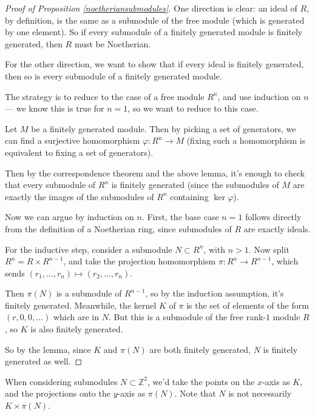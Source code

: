 \begin{proof}[Proof of Proposition \ref{noetheriansubmodules}]
    One direction is clear: an ideal of $R$, by definition, is the same as a submodule of the free module (which is generated by one element). So if every submodule of a finitely generated module is finitely generated, then $R$ must be Noetherian. 

    For the other direction, we want to show that if every ideal is finitely generated, then so is every submodule of a finitely generated module. 

    The strategy is to reduce to the case of a free module $R^n$, and use induction on $n$ --- we know this is true for $n = 1$, so we want to reduce to this case. 

    Let $M$ be a finitely generated module. Then by picking a set of generators, we can find a surjective homomorphism $\varphi : R^n \to M$ (fixing such a homomorphism is equivalent to fixing a set of generators). 

    Then by the correspondence theorem and the above lemma, it's enough to check that every submodule of $R^n$ is finitely generated (since the submodules of $M$ are exactly the images of the submodules of $R^n$ containing $\ker \varphi$). 

    Now we can argue by induction on $n$. First, the base case $n = 1$ follows directly from the definition of  a Noetherian ring, since submodules of $R$ are exactly ideals. 

    For the inductive step, consider a submodule $N \subset R^n$, with $n > 1$. Now split $R^n = R \times R^{n - 1}$, and take the projection homomorphism $\pi : R^n \to R^{n - 1}$, which sends $(r_1, \ldots, r_n) \mapsto (r_2, \ldots, r_n)$. 

    Then $\pi(N)$ is a submodule of $R^{n - 1}$, so by the induction assumption, it's finitely generated. Meanwhile, the kernel $K$ of $\pi$ is the set of elements of the form $(r, 0, 0, \ldots)$ which are in $N$. But this is a submodule of the free rank-$1$ module $R$, so $K$ is also finitely generated. 

    So by the lemma, since $K$ and $\pi(N)$ are both finitely generated, $N$ is finitely generated as well. 
\end{proof}

\begin{example}
    When considering submodules $N \subset \mathbb{Z}^2$, we'd take the points on the $x$-axis as $K$, and the projections onto the $y$-axis as $\pi(N)$. Note that $N$ is not necessarily $K \times \pi(N)$. 
\end{example} 

